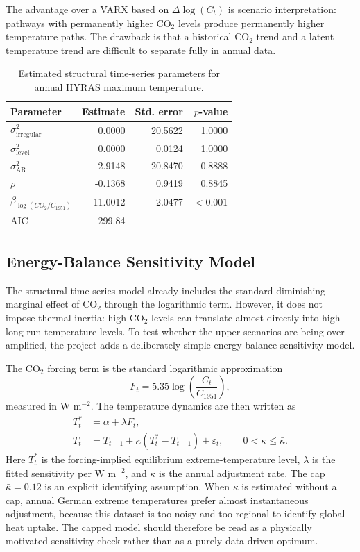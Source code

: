 \documentclass[11pt,a4paper]{article}
\begin{document}
The advantage over a VARX based on $\Delta\log(C_t)$ is scenario interpretation:
pathways with permanently higher CO$_2$ levels produce permanently higher
temperature paths. The drawback is that a historical CO$_2$ trend and a latent
temperature trend are difficult to separate fully in annual data.

\begin{table}[htbp]
  \centering
  \caption{Estimated structural time-series parameters for annual HYRAS maximum
  temperature.}
  \label{tab:sts-coefficients}
  \begin{tabular}{lrrr}
    \toprule
    Parameter & Estimate & Std. error & $p$-value \\
    \midrule
    $\sigma^2_{\mathrm{irregular}}$ & 0.0000 & 20.5622 & 1.0000 \\
    $\sigma^2_{\mathrm{level}}$ & 0.0000 & 0.0124 & 1.0000 \\
    $\sigma^2_{\mathrm{AR}}$ & 2.9148 & 20.8470 & 0.8888 \\
    $\rho$ & -0.1368 & 0.9419 & 0.8845 \\
    $\beta_{\log(CO_2/C_{1951})}$ & 11.0012 & 2.0477 & $<0.001$ \\
    \midrule
    AIC & 299.84 & & \\
    \bottomrule
  \end{tabular}
\end{table}

\subsection{Energy-Balance Sensitivity Model}

The structural time-series model already includes the standard diminishing
marginal effect of CO$_2$ through the logarithmic term. However, it does not
impose thermal inertia: high CO$_2$ levels can translate almost directly into
high long-run temperature levels. To test whether the upper scenarios are being
over-amplified, the project adds a deliberately simple energy-balance
sensitivity model.

The CO$_2$ forcing term is the standard logarithmic approximation
\begin{equation}
  F_t = 5.35 \log\left(\frac{C_t}{C_{1951}}\right),
\end{equation}
measured in W m$^{-2}$. The temperature dynamics are then written as
\begin{align}
  T^*_t &= \alpha + \lambda F_t, \\
  T_t &= T_{t-1} + \kappa\left(T^*_t - T_{t-1}\right) + \varepsilon_t,
  \qquad 0 < \kappa \leq \bar{\kappa}.
\end{align}
Here $T^*_t$ is the forcing-implied equilibrium extreme-temperature level,
$\lambda$ is the fitted sensitivity per W m$^{-2}$, and $\kappa$ is the annual
adjustment rate. The cap $\bar{\kappa}=0.12$ is an explicit identifying
assumption. When $\kappa$ is estimated without a cap, annual German extreme
temperatures prefer almost instantaneous adjustment, because this dataset is too
noisy and too regional to identify global heat uptake. The capped model should
therefore be read as a physically motivated sensitivity check rather than as a
purely data-driven optimum.
\end{document}
